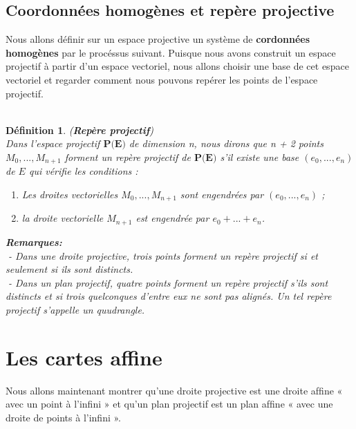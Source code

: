 \documentclass[12pt]{report}
\newtheorem{madef}{Définition}[section]
\begin{document}
\subsection{Coordonnées homogènes et repère projective}
Nous allons définir sur un espace projective un système de \textbf{cordonnées homogènes} par le procéssus suivant. Puisque nous avons construit un espace projectif à partir d'un espace vectoriel, nous allons choisir une base de cet espace vectoriel et regarder comment nous pouvons repérer les points de l'espace projectif.\\
 \\
 
 \begin{madef} (\textbf{Repère projectif})\\
   Dans l’espace projectif $\textbf{P(E)}$ de dimension n, nous dirons que 
   n + 2 points $M_0,. . . ,M_{n+1}$ forment un repère projectif de $\textbf{P(E)}$ s'il existe une base 
   $(e_{0}, . . . , e_{n})$ de $E$ qui vérifie les conditions :
    \begin{enumerate}
    	\item   Les droites vectorielles $M_0,. . . ,M_{n+1}$ sont engendrées par $(e_0, . . . , e_{n})$  ;
    	\item   la droite vectorielle $M_{n+1}$ est engendrée par $e_0 + . . . + e_{n}$.
    \end{enumerate} 
  \textbf{Remarques:} \\
    - Dans une droite projective, trois points forment un repère projectif si et seulement 
  si ils sont distincts. \\
    - Dans un plan projectif, quatre points forment un repère projectif s’ils sont distincts 
  et si trois quelconques d’entre eux ne sont pas alignés. Un tel repère projectif 
  s'appelle un quudrangle. 
  
 \end{madef}
\section{Les cartes affine}
Nous allons maintenant montrer qu’une droite projective est une droite afﬁne « avec un point à l’inﬁni » et qu’un plan projectif est un plan afﬁne « avec une droite de points à l’inﬁni ». 
\end{document}
